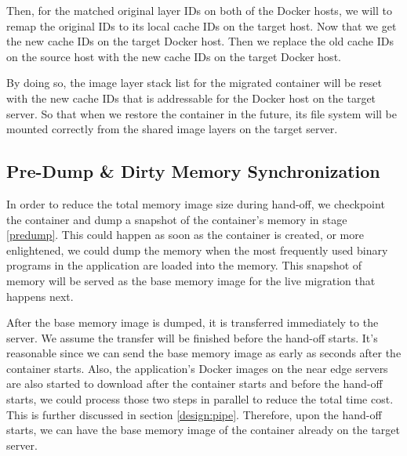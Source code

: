 Then, for the matched original layer IDs on both of the Docker hosts, we will to remap the original IDs to its local cache IDs on the target host. Now that we get the new cache IDs on the target Docker host. Then we replace the old cache IDs on the source host with the new cache IDs on the target Docker host.  

By doing so, the image layer stack list for the migrated container will be reset with the new cache IDs that is addressable for the Docker host on the target server. So that when we restore the container in the future, its file system will be mounted correctly from the shared image layers on the target server.






\subsection{Pre-Dump \& Dirty Memory Synchronization} \label{design:memDiff}

In order to reduce the total memory image size during hand-off, we checkpoint the container and dump a snapshot of the container's memory in stage \ref{predump}. This could happen as soon as the container is created, or more enlightened, we could dump the memory when the most frequently used binary programs in the application are loaded into the memory. This snapshot of memory will be served as the base memory image for the live migration that happens next.

After the base memory image is dumped, it is transferred immediately to the server. We assume the transfer will be finished before the hand-off starts. It's reasonable since we can send the base memory image as early as seconds after the container starts. 
Also, the application's Docker images on the near edge servers are also started to download after the container starts and before the hand-off starts, we could process those two steps in parallel to reduce the total time cost. This is further discussed in section \ref{design:pipe}. Therefore, upon the hand-off starts, we can have the base memory image of the container already on the target server. 

